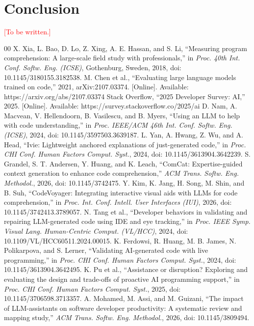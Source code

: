 \documentclass[conference]{IEEEtran}
\newcommand{\todo}[1]{\textcolor{red}{[#1]}}
\begin{document}
\section{Conclusion}\label{sec:conclusion}
\todo{To be written.}

\begin{thebibliography}{00}
 X. Xia, L. Bao, D. Lo, Z. Xing, A. E. Hassan, and S. Li, ``Measuring program comprehension: A large-scale field study with professionals,'' in \textit{Proc. 40th Int. Conf. Softw. Eng. (ICSE)}, Gothenburg, Sweden, 2018, doi: 10.1145/3180155.3182538.
 M. Chen et al., ``Evaluating large language models trained on code,'' 2021, arXiv:2107.03374. [Online]. Available: https://arxiv.org/abs/2107.03374
 Stack Overflow, ``2025 Developer Survey: AI,'' 2025. [Online]. Available: https://survey.stackoverflow.co/2025/ai
 D. Nam, A. Macvean, V. Hellendoorn, B. Vasilescu, and B. Myers, ``Using an LLM to help with code understanding,'' in \textit{Proc. IEEE/ACM 46th Int. Conf. Softw. Eng. (ICSE)}, 2024, doi: 10.1145/3597503.3639187.
 L. Yan, A. Hwang, Z. Wu, and A. Head, ``Ivie: Lightweight anchored explanations of just-generated code,'' in \textit{Proc. CHI Conf. Human Factors Comput. Syst.}, 2024, doi: 10.1145/3613904.3642239.
 S. Grandel, S. T. Andersen, Y. Huang, and K. Leach, ``ComCat: Expertise-guided context generation to enhance code comprehension,'' \textit{ACM Trans. Softw. Eng. Methodol.}, 2026, doi: 10.1145/3742475.
 Y. Kim, K. Jang, H. Song, M. Shin, and B. Suh, ``CodeVoyager: Integrating interactive visual aids with LLMs for code comprehension,'' in \textit{Proc. Int. Conf. Intell. User Interfaces (IUI)}, 2026, doi: 10.1145/3742413.3789057.
 N. Tang et al., ``Developer behaviors in validating and repairing LLM-generated code using IDE and eye tracking,'' in \textit{Proc. IEEE Symp. Visual Lang. Human-Centric Comput. (VL/HCC)}, 2024, doi: 10.1109/VL/HCC60511.2024.00015.
 K. Ferdowsi, R. Huang, M. B. James, N. Polikarpova, and S. Lerner, ``Validating AI-generated code with live programming,'' in \textit{Proc. CHI Conf. Human Factors Comput. Syst.}, 2024, doi: 10.1145/3613904.3642495.
 K. Pu et al., ``Assistance or disruption? Exploring and evaluating the design and trade-offs of proactive AI programming support,'' in \textit{Proc. CHI Conf. Human Factors Comput. Syst.}, 2025, doi: 10.1145/3706598.3713357.
 A. Mohamed, M. Assi, and M. Guizani, ``The impact of LLM-assistants on software developer productivity: A systematic review and mapping study,'' \textit{ACM Trans. Softw. Eng. Methodol.}, 2026, doi: 10.1145/3809494.

\end{thebibliography}
\end{document}
